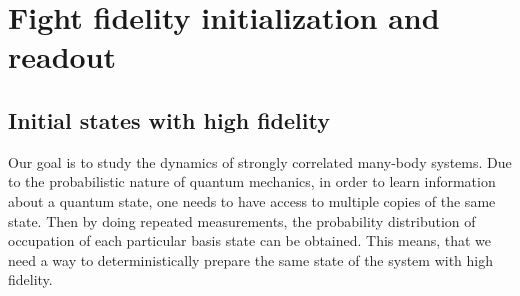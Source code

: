 \chapter{Fight fidelity initialization and readout}

\section{Initial states with high fidelity}

Our goal is to study the dynamics of strongly correlated many-body systems. Due to the probabilistic nature of quantum mechanics, in order to learn information about a quantum state, one needs to have access to multiple copies of the same state. Then by doing repeated measurements, the probability distribution of occupation of each particular basis state can be obtained. This means, that we need a way to deterministically prepare the same state of the system with high fidelity. 

